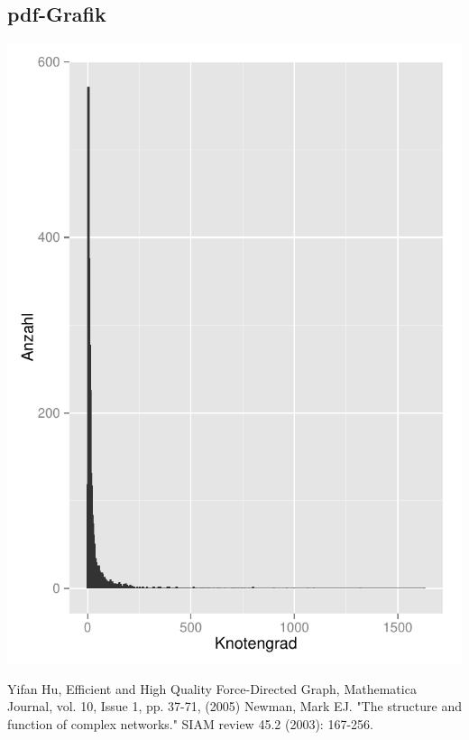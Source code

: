 \documentclass[12pt, a4paper]{article}
\begin{document}
\subsection{pdf-Grafik}
\includegraphics{testplot.pdf}


\newpage
\begin{thebibliography}{9}
	 Yifan Hu, Efficient and High Quality Force-Directed Graph, Mathematica Journal, vol. 10, Issue 1, pp. 37-71, (2005)
         Newman, Mark EJ. "The structure and function of complex networks." SIAM review 45.2 (2003): 167-256.
\end{thebibliography}
\end{document}
